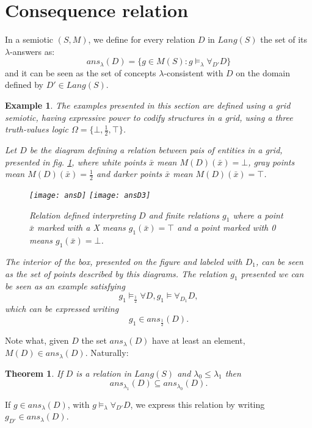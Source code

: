 \documentclass[oribibl]{llncs}
\newtheorem{thm}{Theorem}
\newtheorem{exam}{Example}
\begin{document}
\section{Consequence relation}\label{consequence relation}
In a semiotic $(S,M)$, we define for every relation $D$ in $Lang(S)$
the set of its $\lambda$-answers as:
\[ ans_\lambda(D)=\{ g \in  M(S): g\models_\lambda \forall_{D'} D\}\]
and it can be seen as the set of concepts $\lambda$-consistent with $D$ on the domain defined by $D'\in Lang(S)$.
\begin{exam}
The examples presented in this section are defined using a grid semiotic, having expressive power to codify structures in a grid, using a three truth-values logic $\Omega=\{\bot,\frac{1}{2},\top\}$.

Let $D$ be the diagram defining a relation between pais of entities in a grid, presented in fig. \ref{grid1}, where white points $\bar{x}$ mean $M(D)(\bar{x})=\bot$, gray points mean $M(D)(\bar{x})=\frac{1}{2}$ and darker points $\bar{x}$ mean $M(D)(\bar{x})=\top$.

\begin{figure}[h]
\begin{center}
\texttt{[image: ansD]} \hspace{1cm}
\texttt{[image: ansD3]}
\end{center}
\caption{Relation defined interpreting $D$ and finite relations $g_1$ where a point $\bar{x}$ marked with a X means $g_1(\bar{x})=\top$ and a point marked with 0 means $g_1(\bar{x})=\bot$.}\label{grid1}
\end{figure}

  The interior of the box, presented on the figure and labeled with $D_1$, can be seen as the set of points described by this diagrams. The relation $g_1$ presented we can be seen as an example satisfying
\[
g_1\models_{\frac{1}{2}} \forall D, g_1\models \forall_{D_1}D,
\]
which can be expressed writing
\[
g_1\in ans_{\frac{1}{2}}(D).
\]
\end{exam}


Note what, given $D$ the set $ans_\lambda(D)$ have at least an element, $M(D)\in ans_\lambda(D)$. Naturally:
\begin{thm}
If $D$ is a relation in $Lang(S)$ and $\lambda_0\leq\lambda_1$ then
\[ans_{\lambda_1}(D)\subseteq ans_{\lambda_0}(D).\]
\end{thm}
If $g\in ans_\lambda(D)$, with $g\models_\lambda \forall_{D'} D$, we express this relation by writing $g_{D'}\in ans_\lambda(D)$.
\end{document}
